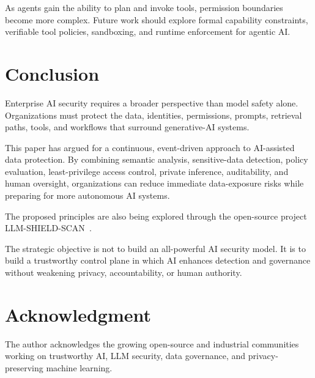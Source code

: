 \documentclass[conference]{IEEEtran}
\begin{document}
As agents gain the ability to plan and invoke tools, permission boundaries become more complex. Future work should explore formal capability constraints, verifiable tool policies, sandboxing, and runtime enforcement for agentic AI.

\section{Conclusion}

Enterprise AI security requires a broader perspective than model safety alone. Organizations must protect the data, identities, permissions, prompts, retrieval paths, tools, and workflows that surround generative-AI systems.

This paper has argued for a continuous, event-driven approach to AI-assisted data protection. By combining semantic analysis, sensitive-data detection, policy evaluation, least-privilege access control, private inference, auditability, and human oversight, organizations can reduce immediate data-exposure risks while preparing for more autonomous AI systems.

The proposed principles are also being explored through the open-source project LLM-SHIELD-SCAN~\cite{lemoine_llm_shield_scan}.

The strategic objective is not to build an all-powerful AI security model. It is to build a trustworthy control plane in which AI enhances detection and governance without weakening privacy, accountability, or human authority.

\section*{Acknowledgment}

The author acknowledges the growing open-source and industrial communities working on trustworthy AI, LLM security, data governance, and privacy-preserving machine learning.
\end{document}
